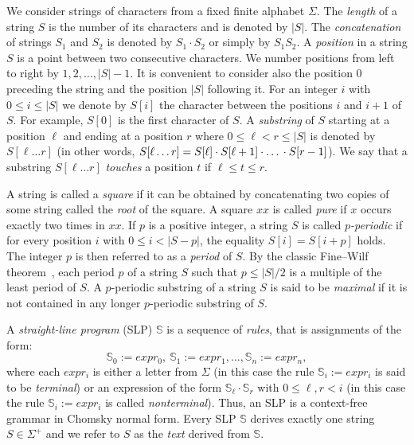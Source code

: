 \documentclass[11pt]{article}
\theoremstyle{break}
\newcommand{\slp}[1]{\mathbb{#1}}
\begin{document}
We consider strings of characters from a fixed finite alphabet $\Sigma$. The \emph{length} of a string $S$ is the number of its characters
and is denoted by $|S|$. The \emph{concatenation} of strings $S_1$ and $S_2$ is denoted by $S_1 \cdot S_2$ or simply by $S_1S_2$. A
\emph{position} in a string $S$ is a point between two consecutive characters. We number positions from left to right by $1,2,\dots,|S|-1$.
It is convenient to consider also the position 0 preceding the string and the position $|S|$ following it. For an integer $i$ with $0 \le i
\le |S|$ we denote by $S[i]$ the character between the positions $i$ and $i+1$ of $S$. For example, $S[0]$ is the first character of $S$. A
\emph{substring} of $S$ starting at a position $\ell$  and ending at a position $r$ where $0\leq \ell < r \leq |S|$ is denoted by $S[\ell
\dots r]$ (in other words, $S[\ell \dots r] = S[\ell]\cdot S[\ell+1]\cdot\mbox{\dots}\cdot S[r-1]$). We say that a substring $S[\ell \dots
r]$ \emph{touches} a position $t$ if $\ell \leq t \leq r$.

A string is called a \emph{square} if it can be obtained by concatenating two copies of some string called the \emph{root} of the square. A
square $xx$ is called \emph{pure} if $x$ occurs exactly two times in $xx$. If $p$ is a positive integer, a string $S$ is called
\emph{$p$-periodic} if for every position $i$ with $0\le i<|S-p|$, the equality $S[i] = S[i + p]$ holds. The integer $p$ is then referred
to as a \emph{period} of $S$. By the classic Fine--Wilf theorem~\cite{20}, each period $p$ of a string $S$ such that $p\le|S|/2$ is a
multiple of the least period of $S$. A $p$-periodic substring of a string $S$ is said to be \emph{maximal} if it is not contained in any
longer $p$-periodic substring of $S$.

A \emph{straight-line program} (SLP) $\slp{S}$ is a sequence of \emph{rules}, that is assignments of the form:
\begin{equation}
\label{eq:SLP} \slp{S}_0 := expr_0,\ \slp{S}_1 := expr_1, \dots, \slp{S}_n := expr_n,
\end{equation}
where each $expr_i$ is either a letter from $\Sigma$ (in this case the rule $\slp{S}_i := expr_i$ is said to be \emph{terminal}) or an
expression of the form $\slp{S}_\ell\cdot \slp{S}_r$ with $0\le \ell, r < i$ (in this case the rule $\slp{S}_i := expr_i$ is called
\emph{nonterminal}). Thus, an SLP is a context-free grammar in Chomsky normal form. Every SLP $\slp{S}$ derives exactly one string
$S\in\Sigma^+$ and we refer to $S$ as the \emph{text} derived from $\slp{S}$.
\end{document}
